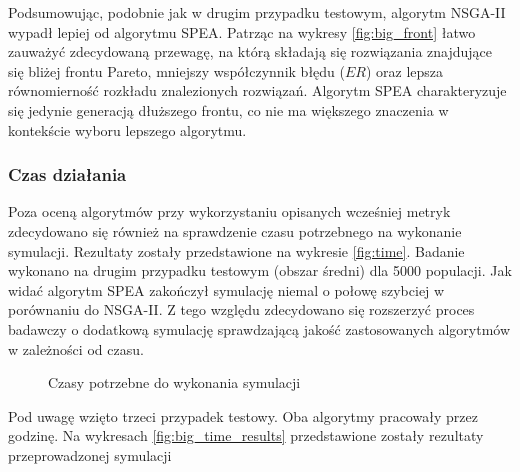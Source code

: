 \documentclass[twoside]{iisthesis}
\begin{document}
Podsumowując, podobnie jak w drugim przypadku testowym, algorytm NSGA-II wypadł lepiej od algorytmu SPEA. Patrząc na wykresy \eqref{fig:big_front} łatwo zauważyć zdecydowaną przewagę, na którą składają się rozwiązania znajdujące się bliżej frontu Pareto, mniejszy współczynnik błędu ($ER$) oraz lepsza równomierność rozkładu znalezionych rozwiązań. Algorytm SPEA charakteryzuje się jedynie generacją dłuższego frontu, co nie ma większego znaczenia w kontekście wyboru lepszego algorytmu.

\subsubsection{Czas działania}
Poza oceną algorytmów przy wykorzystaniu opisanych wcześniej metryk zdecydowano się również na sprawdzenie czasu potrzebnego na wykonanie symulacji. Rezultaty zostały przedstawione na wykresie \eqref{fig:time}. Badanie wykonano na drugim przypadku testowym (obszar średni) dla 5000 populacji. Jak widać algorytm SPEA zakończył symulację niemal o połowę szybciej w porównaniu do NSGA-II. Z tego względu zdecydowano się rozszerzyć proces badawczy o dodatkową symulację sprawdzającą jakość zastosowanych algorytmów w zależności od czasu.
\begin{figure}[H]
	\centering
	\caption{Czasy potrzebne do wykonania symulacji}
	\label{fig:time}
\end{figure}
Pod uwagę wzięto trzeci przypadek testowy. Oba algorytmy pracowały przez godzinę. Na wykresach \eqref{fig:big_time_results} przedstawione zostały rezultaty przeprowadzonej symulacji
\end{document}
